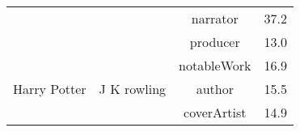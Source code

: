 \begin{table}[!t]
\begin{tabular}{cccr}
    \multicolumn{1}{c}{} & \multicolumn{1}{c}{} & narrator & 37.2 \\
    \multicolumn{1}{c}{} & \multicolumn{1}{c}{} & producer & 13.0 \\
    \hline
    \multicolumn{1}{c}{\multirow{3}{*}{\parbox{1cm}{\centering \vspace{-1mm} Harry Potter}}} & \multicolumn{1}{c}{\multirow{3}[0]{*}{J K rowling}} & notableWork & 16.9 \\
    \multicolumn{1}{c}{} & \multicolumn{1}{c}{} & author & 15.5 \\
    \multicolumn{1}{c}{} & \multicolumn{1}{c}{} & coverArtist & 14.9 \\
    \bottomrule
    \end{tabular}%
  \label{tab:results}%
\vspace{-8mm}
\end{table}%



